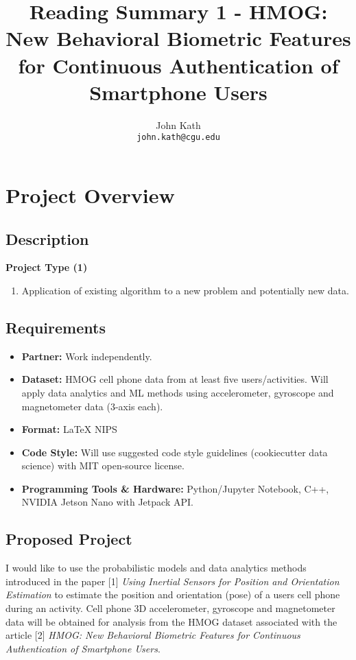 \documentclass{article}
\title{Reading Summary 1 - HMOG: New Behavioral Biometric Features for Continuous Authentication of Smartphone Users}
\author{
  John Kath \\
  \texttt{john.kath@cgu.edu} \\
}
\begin{document}
\maketitle


\section{Project Overview}

\subsection{Description}

\textbf{Project Type (1)}

\begin{enumerate}
  \item Application of existing algorithm to a new problem and
    potentially new data.
\end{enumerate}

\subsection{Requirements}

\begin{itemize}
  \item \textbf{Partner:} Work independently.
  \item \textbf{Dataset:} HMOG cell phone data from at least five
    users/activities. Will apply data analytics and ML methods using
    accelerometer, gyroscope and magnetometer data (3-axis each).
  \item \textbf{Format:} \LaTeX{} NIPS
  \item \textbf{Code Style:} Will use suggested code style guidelines
    (cookiecutter data science) with MIT open-source license.
  \item \textbf{Programming Tools \& Hardware:} Python/Jupyter
    Notebook, C++, NVIDIA Jetson Nano with Jetpack API.
\end{itemize}

\subsection{Proposed Project}

I would like to use the probabilistic models and data analytics methods
introduced in the paper [1] \textit{Using Inertial Sensors for Position
and Orientation Estimation} to estimate the position and orientation
(pose) of a users cell phone during an activity. Cell phone 3D
accelerometer, gyroscope and magnetometer data will be obtained for
analysis from the HMOG dataset associated with the article [2]
\textit{HMOG: New Behavioral Biometric Features for Continuous
Authentication of Smartphone Users}.
\end{document}
